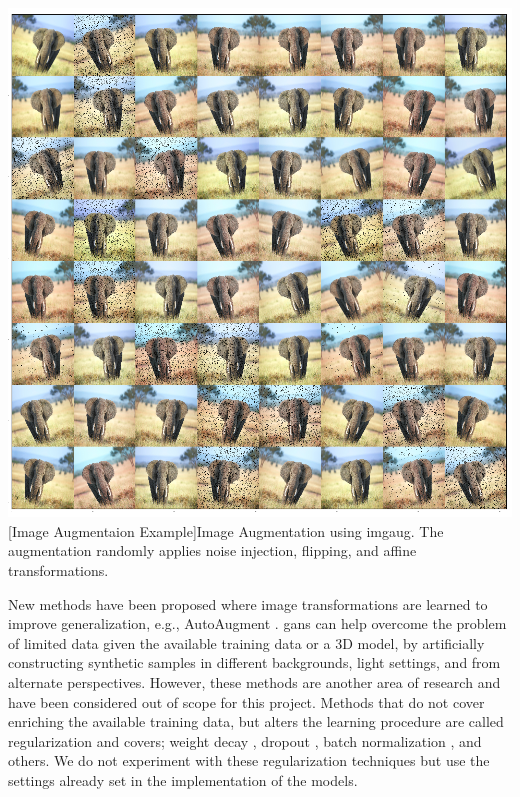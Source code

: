 \begin{enumdescript}
\begin{enumdescript}
		\begin{minipage}[t]{\linewidth}
			\centering
			\includegraphics[width=.7\linewidth]{figures/augmentation/augmentation_high_resolution.png}
			[Image Augmentaion Example]{Image Augmentation using \gls{imgaug}. The augmentation randomly applies noise injection, flipping, and affine transformations.}
			\label{fig:augmentation}
		\end{minipage}
		
		New methods have been proposed where image transformations are learned to improve generalization, e.g., AutoAugment \cite{cubuk_autoaugment:_2018}. \gls{gan}s can help overcome the problem of limited data given the available training data or a 3D model, by artificially constructing synthetic samples in different backgrounds, light settings, and from alternate perspectives. However, these methods are another area of research and have been considered out of scope for this project. Methods that do not cover enriching the available training data, but alters the learning procedure are called regularization and covers; weight decay \cite{krogh_simple_nodate}, dropout \cite{srivastava_dropout:_nodate}, batch normalization \cite{ioffe_batch_2015}, and others. We do not experiment with these regularization techniques but use the settings already set in the implementation of the models.
		

\end{enumdescript}
\end{enumdescript}

